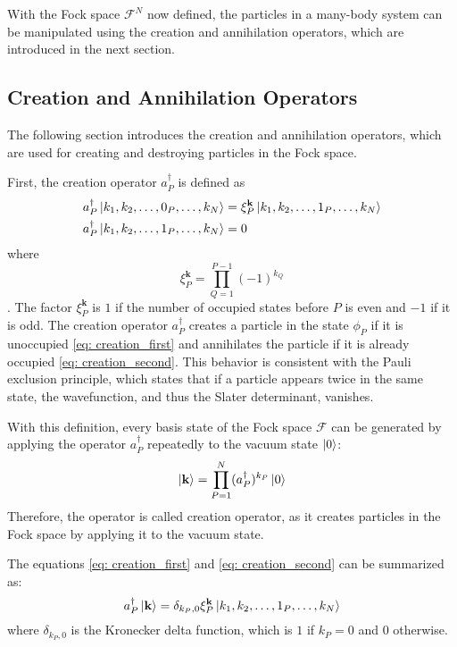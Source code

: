With the Fock space $\mathcal{F}^N$ now defined, the particles in a many-body system can be manipulated using the creation and annihilation operators, which are introduced in the next section.

\subsection{Creation and Annihilation Operators}

The following section introduces the creation and annihilation operators, which are used for creating and destroying particles in the Fock space.

First, the creation operator $a_P^{\dagger}$ is defined as
\begin{align}
    a_P^{\dagger} \ket{k_1, k_2, \ldots, 0_P, \ldots, k_N} &= \xi_P^{\mathbf{k}} \ket{k_1, k_2, \ldots, 1_P, \ldots, k_N} \label{eq: creation_first} \\
    a_P^{\dagger} \ket{k_1, k_2, \ldots, 1_P, \ldots, k_N} &= 0 \label{eq: creation_second}
\end{align}
where 
\begin{equation}
    \xi_P^{\mathbf{k}} = \prod_{Q=1}^{P-1} (-1)^{k_Q}
\end{equation}
\cite{Altland, Helgaker2000}. The factor $\xi_P^{\textbf{k}}$ is $1$ if the number of occupied states before $P$ is even and $-1$ if it is odd. The creation operator $a_P^{\dagger}$ creates a particle in the state $\phi_P$ if it is unoccupied \eqref{eq: creation_first} and annihilates the particle if it is already occupied \eqref{eq: creation_second}. This behavior is consistent with the Pauli exclusion principle, which states that if a particle appears twice in the same state, the wavefunction, and thus the Slater determinant, vanishes.

With this definition, every basis state of the Fock space $\mathcal{F}$ can be generated by applying the operator $a_P^{\dagger}$ repeatedly to the vacuum state $\ket{0}$:
\begin{equation}
    \ket{\mathbf{k}} =\prod_{P=1}^{N} (a_P^{\dagger})^{k_P} \ket{0}
\end{equation}
Therefore, the operator is called creation operator, as it creates particles in the Fock space by applying it to the vacuum state.

The equations \eqref{eq: creation_first} and \eqref{eq: creation_second} can be summarized as:
\begin{equation}
    a_P^{\dagger}\ket{\mathbf{k}} = \delta_{k_P, 0} \xi_P^{\mathbf{k}} \ket{k_1, k_2, \ldots, 1_P, \ldots, k_N}
\end{equation}
where $\delta_{k_P, 0}$ is the Kronecker delta function, which is $1$ if $k_P = 0$ and $0$ otherwise.

